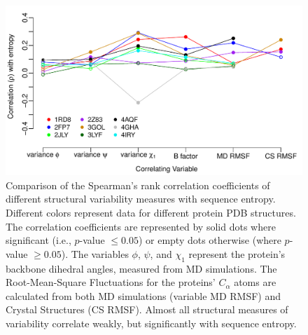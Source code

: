 \documentclass[12pt]{article}
\begin{document}
            \begin{figure}[t]
            \begin{center}
                \includegraphics[height=0.35\textheight]{cor_entropy_SF.pdf}
            \end{center}
            \caption{
                     Comparison of the Spearman's rank correlation coefficients of different structural variability measures with sequence entropy. Different colors represent data for different protein PDB structures. The correlation coefficients are represented by solid dots where significant (i.e., $p$-value $\leq0.05$) or empty dots otherwise (where $p$-value $\geq0.05$). The variables $\phi$, $\psi$, and $\chi_1$ represent the protein's backbone dihedral angles, measured from MD simulations. The Root-Mean-Square Fluctuations for the proteins' $C_\alpha$ atoms are calculated from both MD simulations (variable MD RMSF) and Crystal Structures (CS RMSF). Almost all structural measures of variability correlate weakly, but significantly with sequence entropy.
                     }
            \label{fig:cor_entropy_SF}
            \end{figure}
	
\end{document}
